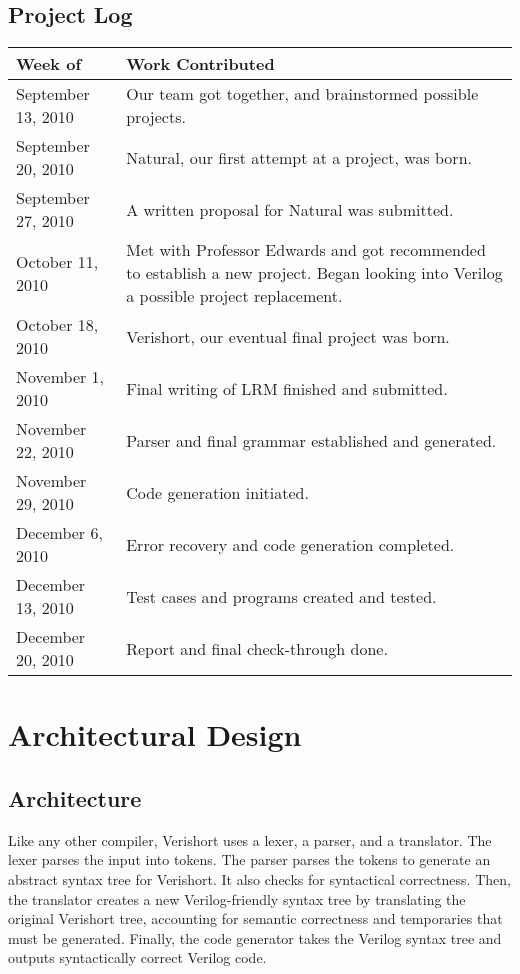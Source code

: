 \documentclass[letterpaper,11pt]{article}
\begin{document}
    
    \subsection{Project Log}
    \begin{center} 
    \begin{tabular}{|l|p{4in}|} \hline
    Week of&Work Contributed\\ \hline
    September 13, 2010 & Our team got together, and brainstormed possible projects. \\
    September 20, 2010 & Natural, our first attempt at a project, was born.\\
    September 27, 2010 & A written proposal for Natural was submitted.\\
    October 11, 2010 & Met with Professor Edwards and got recommended to establish a new project. Began looking into 
    Verilog a possible project replacement. \\
    October 18, 2010 & Verishort, our eventual final project was born.\\
    November 1, 2010 & Final writing of LRM finished and submitted. \\
    November 22, 2010 & Parser and final grammar established and generated. \\ %
    November 29, 2010 & Code generation initiated. \\ %
    December 6, 2010 & Error recovery and code generation completed.\\ %
    December 13, 2010 & Test cases and programs created and tested. \\ %
    December 20, 2010 &  Report and final check-through done. \\ \hline %

    \end{tabular}
    \end{center}

\section{Architectural Design}
    \subsection{Architecture}
    Like any other compiler, Verishort uses a lexer, a parser, and a translator.  The lexer parses the input into tokens.  The parser parses the tokens to generate an abstract syntax tree for Verishort.  It also checks for syntactical correctness.  Then, the translator creates a new Verilog-friendly syntax tree by translating the original Verishort tree, accounting for semantic correctness and temporaries that must be generated.  Finally, the code generator takes the Verilog syntax tree and outputs syntactically correct Verilog code.
\end{document}
